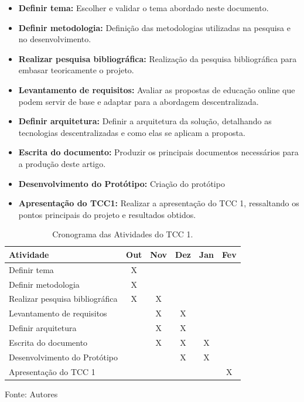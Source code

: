 \begin{itemize}
    \item \textbf{Definir tema:} Escolher e validar o tema abordado neste documento.
    \item \textbf{Definir metodologia:} Definição das metodologias utilizadas na pesquisa e no desenvolvimento.
    \item \textbf{Realizar pesquisa bibliográfica:} Realização da pesquisa bibliográfica para embasar teoricamente o projeto.
    \item \textbf{Levantamento de requisitos:} Avaliar as propostas de educação online que podem servir de base e adaptar para a abordagem descentralizada.
    \item \textbf{Definir arquitetura:} Definir a arquitetura da solução, detalhando as tecnologias descentralizadas e como elas se aplicam a proposta.
    \item \textbf{Escrita do documento:} Produzir os principais documentos necessários para a produção deste artigo.
    \item \textbf{Desenvolvimento do Protótipo:} Criação do protótipo 
    \item \textbf{Apresentação do TCC1:} Realizar a apresentação do TCC 1, ressaltando os pontos principais do projeto e resultados obtidos.
\end{itemize}

\begin{table}[h]
    \centering
    \caption{Cronograma das Atividades do TCC 1.}
    \label{tab:cronograma_tcc1}
    \begin{adjustbox}{width=\textwidth}
    \begin{tabular}{|l|c|c|c|c|c|}
        \hline
        \textbf{Atividade} & \textbf{Out} & \textbf{Nov} & \textbf{Dez} & \textbf{Jan} & \textbf{Fev} \\
        \hline
        Definir tema & X &  &  &  &  \\
        Definir metodologia & X &  &  &  &  \\
        Realizar pesquisa bibliográfica & X & X &  &  &  \\
        Levantamento de requisitos &  & X & X &  &  \\
        Definir arquitetura &  & X & X &  &  \\
        Escrita do documento &  & X & X & X &  \\
        Desenvolvimento do Protótipo &  &  & X & X &  \\
        Apresentação do TCC 1 &  &  &  &  & X \\
        \hline
    \end{tabular}
    \end{adjustbox}
    \vspace{5mm}
    {\footnotesize Fonte: Autores}
\end{table}

